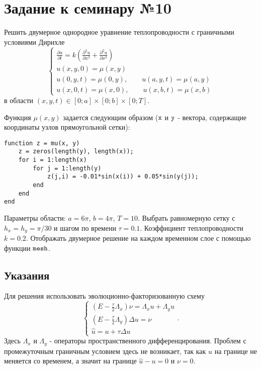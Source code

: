 \section{Задание к семинару №10}
Решить двумерное однородное уравнение теплопроводности с граничными условиями Дирихле 
\begin{equation} \label{c10eq1}
	\begin{cases}
		\displaystyle \frac{\partial u}{\partial t} = k \left( \frac{\partial^2 u}{\partial x^2} + \frac{\partial^2 u}{\partial x^2} \right) \\
		\displaystyle u(x,y,0) = \mu(x,y) \\
		u(0,y,t) = \mu(0,y), \qquad u(a,y,t) = \mu(a,y)\\  
		u(x,0,t) = \mu(x,0), \qquad u(x,b,t) = \mu(x,b)
	\end{cases}
\end{equation}
в области $(x,y,t) \in [0; a] \times [0; b] \times [0; T]$.

Функция $\mu(x,y)$ задается следующим образом ($\texttt{\lstinline|x|}$ и $\texttt{\lstinline|y|}$ - вектора, содержащие координаты узлов прямоугольной сетки):
\begin{matlablisting}
	\begin{lstlisting}
function z = mu(x, y)
    z = zeros(length(y), length(x));
    for i = 1:length(x)
        for j = 1:length(y)
            z(j,i) = -0.01*sin(x(i)) + 0.05*sin(y(j));
        end
    end
end
	\end{lstlisting}
\end{matlablisting}
Параметры области: $a = 6\pi$, $b = 4\pi$, $T = 10$. Выбрать равномерную сетку с $h_x = h_y = \pi/30$ и шагом по времени $\tau = 0.1$. Коэффициент теплопроводности $k = 0.2$. Отображать двумерное решение на каждом временном слое с помощью функции $\texttt{\lstinline|mesh|}$.

\subsection{Указания}
Для решения использовать эволюционно-факторизованную схему
\begin{equation} \label{c10eq2}
	\begin{cases}
		\displaystyle \left( E - \frac{\tau}{2} \Lambda_x \right) \nu = \Lambda_x u + \Lambda_y u \\
		\displaystyle \left( E - \frac{\tau}{2} \Lambda_y \right) \Delta u = \nu \\
		\hat{u} = u + \tau \Delta u
	\end{cases}.
\end{equation}
Здесь $\Lambda_x$ и $\Lambda_y$ - операторы пространственного дифференцирования. Проблем с промежуточным граничным условием здесь не возникает, так как $u$ на границе не меняется со временем, а значит на границе $\hat{u} - u = 0$ и $\nu = 0$.


